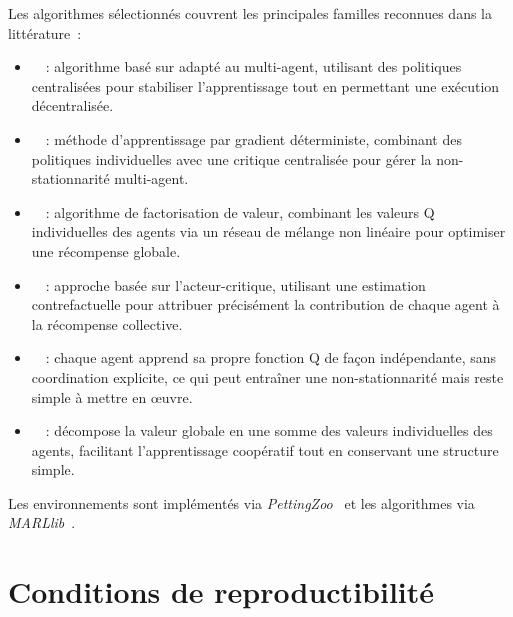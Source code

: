 \medskip

Les algorithmes  sélectionnés couvrent les principales familles reconnues dans la littérature~:
\begin{itemize}
    \item {}~\cite{Yu2022}~: algorithme basé sur  adapté au multi-agent, utilisant des politiques centralisées pour stabiliser l'apprentissage tout en permettant une exécution décentralisée.
    \item {}~\cite{lowe2017multi}~: méthode d'apprentissage par gradient déterministe, combinant des politiques individuelles avec une critique centralisée pour gérer la non-stationnarité multi-agent.
    \item {}~\cite{rashid2018qmix}~: algorithme de factorisation de valeur, combinant les valeurs Q individuelles des agents via un réseau de mélange non linéaire pour optimiser une récompense globale.
    \item {}~\cite{foerster2018counterfactual}~: approche basée sur l'acteur-critique, utilisant une estimation contrefactuelle pour attribuer précisément la contribution de chaque agent à la récompense collective.
    \item {}~\cite{Jiang2022}~: chaque agent apprend sa propre fonction Q de façon indépendante, sans coordination explicite, ce qui peut entraîner une non-stationnarité mais reste simple à mettre en œuvre.
    \item {}~\cite{sunehag2018value}~: décompose la valeur globale en une somme des valeurs individuelles des agents, facilitant l'apprentissage coopératif tout en conservant une structure simple.
\end{itemize}
Les environnements sont implémentés via \textit{PettingZoo}~\cite{terry2020pettingzoo} et les algorithmes via \textit{MARLlib}~\cite{hu2022marllib}.

\section{Conditions de reproductibilité}

